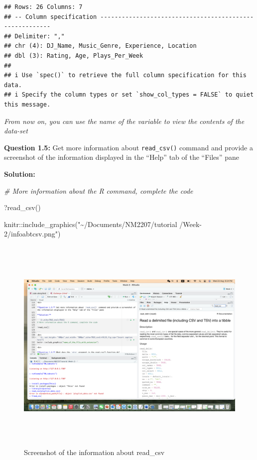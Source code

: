 \documentclass[
]{article}
\newenvironment{Shaded}{\begin{snugshade}}{\end{snugshade}}
\newcommand{\CommentTok}[1]{\textcolor[rgb]{0.56,0.35,0.01}{\textit{#1}}}
\newcommand{\FunctionTok}[1]{\textcolor[rgb]{0.00,0.00,0.00}{#1}}
\newcommand{\NormalTok}[1]{#1}
\newcommand{\SpecialCharTok}[1]{\textcolor[rgb]{0.00,0.00,0.00}{#1}}
\newcommand{\StringTok}[1]{\textcolor[rgb]{0.31,0.60,0.02}{#1}}
\begin{document}
\begin{verbatim}
## Rows: 26 Columns: 7
## -- Column specification --------------------------------------------------------
## Delimiter: ","
## chr (4): DJ_Name, Music_Genre, Experience, Location
## dbl (3): Rating, Age, Plays_Per_Week
## 
## i Use `spec()` to retrieve the full column specification for this data.
## i Specify the column types or set `show_col_types = FALSE` to quiet this message.
\end{verbatim}

\emph{From now on, you can use the name of the variable to view the
contents of the data-set}

\textbf{Question 1.5:} Get more information about \texttt{read\_csv()}
command and provide a screenshot of the information displayed in the
``Help'' tab of the ``Files'' pane

\textbf{Solution:}

\begin{Shaded}
\begin{Highlighting}[]
\CommentTok{\# More information about the R command, complete the code}

\NormalTok{?}\FunctionTok{read\_csv}\NormalTok{()}
\end{Highlighting}
\end{Shaded}

\begin{Shaded}
\begin{Highlighting}[]
\NormalTok{knitr}\SpecialCharTok{::}\FunctionTok{include\_graphics}\NormalTok{(}\StringTok{"\textasciitilde{}/Documents/NM2207/tutorial /Week{-}2/infoabtcsv.png"}\NormalTok{)}
\end{Highlighting}
\end{Shaded}

\begin{figure}
\includegraphics[width=800px,height=400px]{../infoabtcsv} \caption{Screenshot of the information about read_csv}\label{fig:unnamed-chunk-5}
\end{figure}
\end{document}
